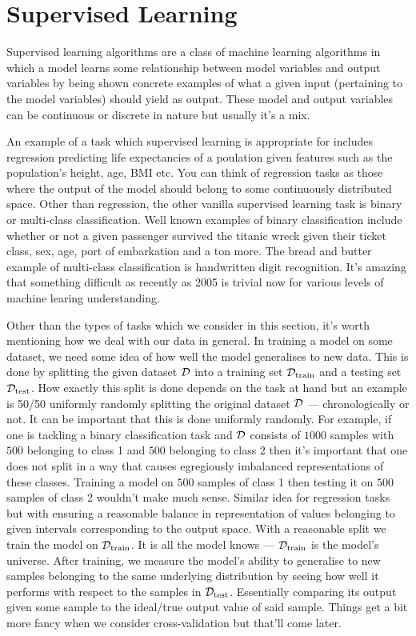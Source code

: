 \documentclass[11pt]{article}
\begin{document}
\section{Supervised Learning}

Supervised learning algorithms are a class of machine learning algorithms in which a model learns some relationship between model variables and output variables by being shown concrete examples of what a given input (pertaining to the model variables) should yield as output. These model and output variables can be continuous or discrete in nature but usually it's a mix.

An example of a task which supervised learning is appropriate for includes regression predicting life expectancies of a poulation given features such as the population's height, age, BMI etc. You can think of regression tasks as those where the output of the model should belong to some continuously distributed space. Other than regression, the other vanilla supervised learning task is binary or multi-class classification. Well known examples of binary classification include whether or not a given passenger survived the titanic wreck given their ticket class, sex, age, port of embarkation and a ton more. The bread and butter example of multi-class classification is handwritten digit recognition. It's amazing that something difficult as recently as 2005 is trivial now for various levels of machine learing understanding.

Other than the types of tasks which we consider in this section, it's worth mentioning how we deal with our data in general. In training a model on some dataset, we need some idea of how well the model generalises to new data. This is done by splitting the given dataset $\mathcal{D}$ into a training set $\mathcal{D}_{\text{train}}$ and a testing set $\mathcal{D}_{\text{test}}$. How exactly this split is done depends on the task at hand but an example is 50/50 uniformly randomly splitting the original dataset $\mathcal{D}$ — chronologically or not. It can be important that this is done uniformly randomly. For example, if one is tackling a binary classification task and $\mathcal{D}$ consists of $1000$ samples with $500$ belonging to class 1 and $500$ belonging to class 2 then it's important that one does not split in a way that causes egregiously imbalanced representations of these classes. Training a model on $500$ samples of class 1 then testing it on $500$ samples of class 2 wouldn't make much sense. Similar idea for regression tasks but with ensuring a reasonable balance in representation of values belonging to given intervals corresponding to the output space. With a reasonable split we train the model on $\mathcal{D}_{\text{train}}$. It is all the model knows — $\mathcal{D}_{\text{train}}$ is the model's universe. After training, we measure the model's ability to generalise to new samples belonging to the same underlying distribution by seeing how well it performs with respect to the samples in $\mathcal{D}_{\text{test}}$. Essentially comparing its output given some sample to the ideal/true output value of said sample. Things get a bit more fancy when we consider cross-validation but that'll come later.
\end{document}
